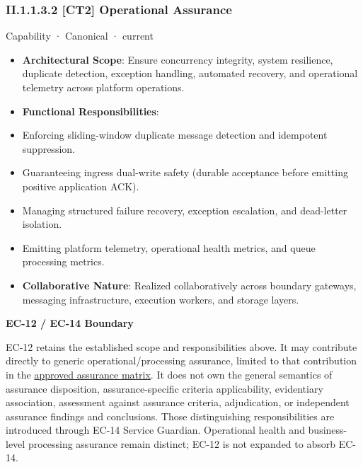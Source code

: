 \subsubsection*{II.1.1.3.2 [CT2] Operational Assurance}
\label{navigation:II.1.1.3.2}

\label{element:938cd44380ab431fa8dae13c702d83c1}
{\small Capability · Canonical · current}\par

\begin{itemize}


\item \textbf{Architectural Scope}: Ensure concurrency integrity, system resilience, duplicate detection, exception handling, automated recovery, and operational telemetry across platform operations.

\item \textbf{Functional Responsibilities}:

\item Enforcing sliding-window duplicate message detection and idempotent suppression.

\item Guaranteeing ingress dual-write safety (durable acceptance before emitting positive application ACK).

\item Managing structured failure recovery, exception escalation, and dead-letter isolation.

\item Emitting platform telemetry, operational health metrics, and queue processing metrics.

\item \textbf{Collaborative Nature}: Realized collaboratively across boundary gateways, messaging infrastructure, execution workers, and storage layers.

\end{itemize}


\par\medskip\textbf{EC-12 / EC-14 Boundary}\par


EC-12 retains the established scope and responsibilities above. It may contribute directly to generic operational/processing assurance, limited to that contribution in the \href{\detokenize{../../../../../docs/markdown/02-strategy/capability-maps/health-service-assurance-derivation.md#collaborative-enterprise-capability-contribution-matrix}}{approved assurance matrix}. It does not own the general semantics of assurance disposition, assurance-specific criteria applicability, evidentiary association, assessment against assurance criteria, adjudication, or independent assurance findings and conclusions. Those distinguishing responsibilities are introduced through EC-14 Service Guardian. Operational health and business-level processing assurance remain distinct; EC-12 is not expanded to absorb EC-14.



